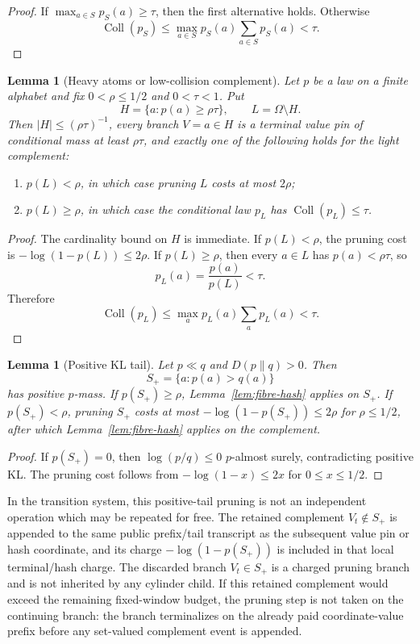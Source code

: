 \documentclass[11pt]{article}
\newtheorem{lemma}[theorem]{Lemma}
\newcommand{\Coll}{\operatorname{Coll}}
\begin{document}
\begin{proof}
If $\max_{a\in S}p_S(a)\ge\tau$, then the first alternative holds.  Otherwise
\[
  \Coll(p_S)\le \max_{a\in S}p_S(a)\sum_{a\in S}p_S(a)<\tau.
\]
\end{proof}

\begin{lemma}[Heavy atoms or low-collision complement]
\label{lem:heavy-or-light-hash}
Let $p$ be a law on a finite alphabet and fix $0<\rho\le1/2$ and
$0<\tau<1$.  Put
\[
  H=\{a:p(a)\ge \rho\tau\},\qquad L=\Omega\setminus H .
\]
Then $|H|\le(\rho\tau)^{-1}$, every branch $V=a\in H$ is a terminal value pin
of conditional mass at least $\rho\tau$, and exactly one of the following
holds for the light complement:
\begin{enumerate}[label=\textup{(\roman*)}]
\item $p(L)<\rho$, in which case pruning $L$ costs at most $2\rho$;
\item $p(L)\ge\rho$, in which case the conditional law $p_L$ has
  $\Coll(p_L)\le\tau$.
\end{enumerate}
\end{lemma}

\begin{proof}
The cardinality bound on $H$ is immediate.  If $p(L)<\rho$, the pruning cost is
$-\log(1-p(L))\le2\rho$.  If $p(L)\ge\rho$, then every $a\in L$ has
$p(a)<\rho\tau$, so
\[
  p_L(a)=\frac{p(a)}{p(L)}<\tau .
\]
Therefore
\[
  \Coll(p_L)\le \max_a p_L(a)\sum_a p_L(a)<\tau .
\]
\end{proof}

\begin{lemma}[Positive KL tail]
\label{lem:positive-tail}
Let $p\ll q$ and $D(p\|q)>0$.  Then
\[
  S_+=\{a:p(a)>q(a)\}
\]
has positive $p$-mass.  If $p(S_+)\ge\rho$, Lemma~\ref{lem:fibre-hash}
applies on $S_+$.  If $p(S_+)<\rho$, pruning $S_+$ costs at most
$-\log(1-p(S_+))\le 2\rho$ for $\rho\le 1/2$, after which
Lemma~\ref{lem:fibre-hash} applies on the complement.
\end{lemma}

\begin{proof}
If $p(S_+)=0$, then $\log(p/q)\le 0$ $p$-almost surely, contradicting
positive KL.  The pruning cost follows from $-\log(1-x)\le 2x$ for
$0\le x\le 1/2$.
\end{proof}

In the transition system, this positive-tail pruning is not an independent
operation which may be repeated for free.  The retained complement
$V_t\notin S_+$ is appended to the same public prefix/tail transcript as the
subsequent value pin or hash coordinate, and its charge
$-\log(1-p(S_+))$ is included in that local terminal/hash charge.  The discarded
branch $V_t\in S_+$ is a charged pruning branch and is not inherited by any
cylinder child.  If this retained complement would exceed the remaining
fixed-window budget, the pruning step is not taken on the continuing branch:
the branch terminalizes on the already paid coordinate-value prefix before any
set-valued complement event is appended.
\end{document}
